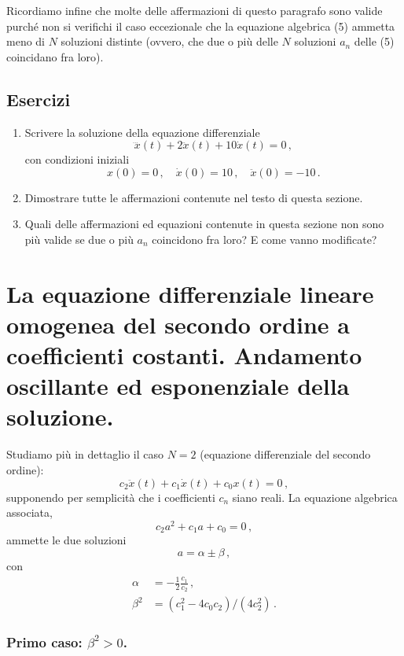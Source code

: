 \documentclass[11pt, a4paper]{book}
\numberwithin{equation}{section}
\newenvironment{esercizi}{\subsection*{Esercizi}\begin{enumerate}}{\end{enumerate}}
\begin{document}
Ricordiamo infine che molte delle affermazioni di questo paragrafo sono valide purché non si verifichi il caso eccezionale che la equazione algebrica (5) ammetta meno di $N$ soluzioni distinte (ovvero, che due o più delle $N$ soluzioni $a_n$ delle (5) coincidano fra loro).

\begin{esercizi}
    \item Scrivere la soluzione della equazione differenziale
    \[
        \dddot{x}(t) + 2\ddot{x}(t) + 10\dot{x}(t) = 0 \,,
    \]
    con condizioni iniziali
    \[
        x(0) = 0 \,, \quad \dot{x}(0) = 10 \,, \quad \ddot{x}(0) = -10 \,.
    \]
    \item Dimostrare tutte le affermazioni contenute nel testo di questa sezione.
    \item[*] Quali delle affermazioni ed equazioni contenute in questa sezione non sono più valide se due o più $a_n$ coincidono fra loro? E come vanno modificate?
\end{esercizi}

\section[EDO secondo ordine a coeff. costanti]{La equazione differenziale lineare omogenea del secondo ordine a coefficienti costanti. Andamento oscillante ed esponenziale della soluzione.}

Studiamo più in dettaglio il caso $N = 2$ (equazione differenziale del secondo ordine):
\begin{equation}
    c_2 \ddot{x}(t) + c_1 \dot{x}(t) + c_0 x(t) = 0 \,,
\end{equation}
supponendo per semplicità che i coefficienti $c_n$ siano reali. La equazione algebrica associata,
\begin{equation}
    c_2 a^2 + c_1 a + c_0 = 0 \,,
\end{equation}
ammette le due soluzioni
\begin{equation}
    a = \alpha \pm \beta \,,
\end{equation}
con
\begin{align}
    \alpha &= -\frac{1}{2}\frac{c_1}{c_2} \,, \tag{4} \\
    \beta^2 &= (c_1^2 - 4 c_0 c_2) / (4 c_2^2) \,. \tag{5}
\end{align}

\subsubsection*{Primo caso: $\beta^2 > 0$.}
\end{document}
